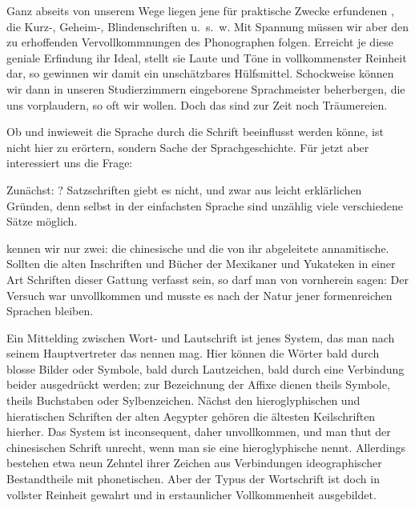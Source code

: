 Ganz abseits von unserem Wege liegen jene für praktische Zwecke erfundenen , die Kurz-, Geheim-, Blindenschriften u.~s.~w. Mit Spannung müssen wir aber den zu erhoffenden Vervollkommnungen des Phonographen folgen. Erreicht je diese geniale Erfindung ihr Ideal, stellt sie Laute und Töne in vollkommenster Reinheit dar, so gewinnen wir damit ein unschätzbares Hülfsmittel. Schockweise können wir dann \label{fp.139} in unseren Studierzimmern eingeborene Sprachmeister beherbergen, die uns vorplaudern, so oft wir wollen. Doch das sind zur Zeit noch Träumereien.

Ob und inwieweit die Sprache durch die Schrift beeinflusst werden könne, ist nicht hier zu erörtern, sondern Sache der Sprachgeschichte. Für jetzt aber interessiert uns die Frage: 

Zunächst: ? Satzschriften giebt es nicht, und zwar aus leicht erklärlichen Gründen, denn selbst in der einfachsten Sprache sind unzählig viele verschiedene Sätze möglich.

\largerpage[1] kennen wir nur zwei: die chinesische und die von ihr abgeleitete annamitische. Sollten die alten Inschriften und Bücher der Mexikaner und Yukateken in einer Art Schriften dieser Gattung verfasst sein, so darf man von vornherein sagen: Der Versuch war unvollkommen und musste es nach der Natur jener formenreichen Sprachen bleiben.

Ein Mittelding zwischen Wort- und Lautschrift ist jenes System, das man nach seinem Hauptvertreter das  nennen mag. Hier können die Wörter bald durch blosse Bilder oder Symbole, bald durch Lautzeichen, bald durch eine Verbindung beider ausgedrückt werden; zur Bezeichnung der Affixe dienen theils Symbole, theils Buchstaben oder Sylbenzeichen. Nächst den hieroglyphischen und hieratischen Schriften der alten Aegypter gehören die ältesten Keilschriften hierher. Das System ist inconsequent, daher unvollkommen, und man thut der chinesischen Schrift unrecht, wenn man sie eine hieroglyphische nennt. Allerdings bestehen etwa neun Zehntel ihrer Zeichen aus Verbindungen ideographischer Bestandtheile mit phonetischen. Aber der Typus der \label{sp.131} Wortschrift ist doch in vollster Reinheit gewahrt und in erstaunlicher Vollkommenheit ausgebildet. 

